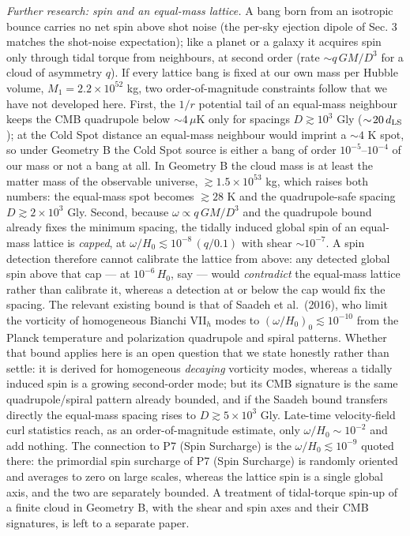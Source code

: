 \documentclass[
]{article}
\begin{document}
\emph{Further research: spin and an equal-mass lattice.} A bang born
from an isotropic bounce carries no net spin above shot noise (the
per-sky ejection dipole of Sec. 3 matches the shot-noise expectation);
like a planet or a galaxy it acquires spin only through tidal torque
from neighbours, at second order (rate \(\sim q\,GM/D^3\) for a cloud of
asymmetry \(q\)). If every lattice bang is fixed at our own mass per
Hubble volume, \(M_1 = 2.2\times10^{52}\) kg, two order-of-magnitude
constraints follow that we have not developed here. First, the \(1/r\)
potential tail of an equal-mass neighbour keeps the CMB quadrupole below
\(\sim\!4\,\mu\)K only for spacings \(D \gtrsim 10^3\) Gly
(\(\sim\!20\,d_{\rm LS}\)); at the Cold Spot distance an equal-mass
neighbour would imprint a \(\sim\!4\) K spot, so under Geometry B the
Cold Spot source is either a bang of order \(10^{-5}\)--\(10^{-4}\) of
our mass or not a bang at all. In Geometry B the cloud mass is at least
the matter mass of the observable universe, \(\gtrsim 1.5\times10^{53}\)
kg, which raises both numbers: the equal-mass spot becomes
\(\gtrsim 28\) K and the quadrupole-safe spacing
\(D \gtrsim 2\times10^3\) Gly. Second, because
\(\omega \propto q\,GM/D^3\) and the quadrupole bound already fixes the
minimum spacing, the tidally induced global spin of an equal-mass
lattice is \emph{capped}, at \(\omega/H_0 \lesssim 10^{-8}\,(q/0.1)\)
with shear \(\sim\!10^{-7}\). A spin detection therefore cannot
calibrate the lattice from above: any detected global spin above that
cap --- at \(10^{-6}\,H_0\), say --- would \emph{contradict} the
equal-mass lattice rather than calibrate it, whereas a detection at or
below the cap would fix the spacing. The relevant existing bound is that
of Saadeh et al.~(2016), who limit the vorticity of homogeneous Bianchi
VII\(_h\) modes to \((\omega/H_0)_0 \lesssim 10^{-10}\) from the Planck
temperature and polarization quadrupole and spiral patterns. Whether
that bound applies here is an open question that we state honestly
rather than settle: it is derived for homogeneous \emph{decaying}
vorticity modes, whereas a tidally induced spin is a growing
second-order mode; but its CMB signature is the same quadrupole/spiral
pattern already bounded, and if the Saadeh bound transfers directly the
equal-mass spacing rises to \(D \gtrsim 5\times10^3\) Gly. Late-time
velocity-field curl statistics reach, as an order-of-magnitude estimate,
only \(\omega/H_0 \sim 10^{-2}\) and add nothing. The connection to P7
(Spin Surcharge) is the \(\omega/H_0 \lesssim 10^{-9}\) quoted there:
the primordial spin surcharge of P7 (Spin Surcharge) is randomly
oriented and averages to zero on large scales, whereas the lattice spin
is a single global axis, and the two are separately bounded. A treatment
of tidal-torque spin-up of a finite cloud in Geometry B, with the shear
and spin axes and their CMB signatures, is left to a separate paper.
\end{document}
